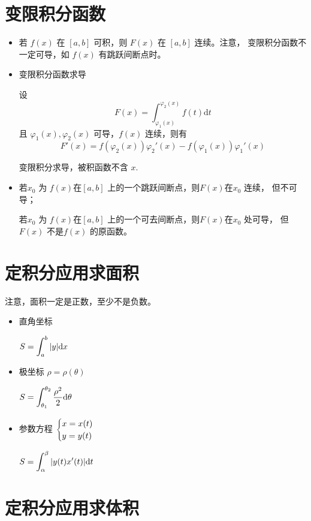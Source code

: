 \section{变限积分函数}


\begin{itemize}
    \item 若 $ f(x) $ 在 $ [a,b] $ 可积，则 $ F(x) $ 在 $ [a,b] $ 连续。注意，
    变限积分函数不一定可导，如 $ f(x) $ 有跳跃间断点时。
    \item 变限积分函数求导
    
    设 $$
        F(x)=\int_{\varphi_1(x)}^{\varphi_2(x)} f(t)\mathrm{d}t
    $$ 且 $ \varphi_1(x),\varphi_2(x) $ 可导，$ f(x) $ 连续，则有$$
        F'(x) = f(\varphi_2(x))\varphi_2'(x)-f(\varphi_1(x))\varphi_1'(x)
    $$ 

    变限积分求导，被积函数不含 $ x. $ 
    \item 若$ x_0 $ 为 $ f(x) $在$ [a,b] $ 上的一个跳跃间断点，则$ F(x) $在$ x_0 $ 连续，
    但不可导；
    
    若$ x_0 $ 为 $ f(x) $在$ [a,b] $ 上的一个可去间断点，则$ F(x) $在$ x_0 $ 处可导，
    但 $ F(x) $ 不是$ f(x) $ 的原函数。
\end{itemize}

\section{定积分应用求面积}

注意，面积一定是正数，至少不是负数。

\begin{itemize}
    \item 直角坐标
    
    $ \displaystyle S = \int_a^b |y| \mathrm{d}x $
    \item 极坐标 $ \rho = \rho(\theta) $
    
    $ \displaystyle S = \int_{\theta_1}^{\theta_2} \dfrac{\rho^2}{2}\mathrm{d}\theta $ 
    \item 参数方程 $ \displaystyle \begin{cases}
        x = x(t) \\ y = y(t)
    \end{cases} $ 

    $ \displaystyle S = \int_\alpha^\beta |y(t)x'(t)|\mathrm{d}t $ 
\end{itemize}

\section{定积分应用求体积}

